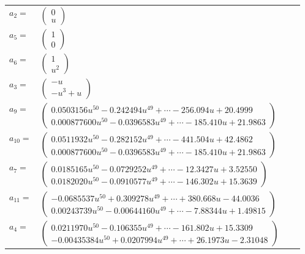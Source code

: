 \documentclass[1p]{elsarticle_modified}
\theoremstyle{definition}
\begin{document}
\begin{tabular}{m{7pt} m{180pt} m{7pt} m{180pt} }
\flushright $a_{2}=$&$\begin{pmatrix}0\\u\end{pmatrix}$ \\
\flushright $a_{5}=$&$\begin{pmatrix}1\\0\end{pmatrix}$ \\
\flushright $a_{6}=$&$\begin{pmatrix}1\\u^2\end{pmatrix}$ \\
\flushright $a_{3}=$&$\begin{pmatrix}- u\\- u^3+u\end{pmatrix}$ \\
\flushright $a_{9}=$&$\begin{pmatrix}0.0503156 u^{50}-0.242494 u^{49}+\cdots-256.094 u+20.4999\\0.000877600 u^{50}-0.0396583 u^{49}+\cdots-185.410 u+21.9863\end{pmatrix}$ \\
\flushright $a_{10}=$&$\begin{pmatrix}0.0511932 u^{50}-0.282152 u^{49}+\cdots-441.504 u+42.4862\\0.000877600 u^{50}-0.0396583 u^{49}+\cdots-185.410 u+21.9863\end{pmatrix}$ \\
\flushright $a_{7}=$&$\begin{pmatrix}0.0185165 u^{50}-0.0729252 u^{49}+\cdots-12.3427 u+3.52550\\0.0182020 u^{50}-0.0910577 u^{49}+\cdots-146.302 u+15.3639\end{pmatrix}$ \\
\flushright $a_{11}=$&$\begin{pmatrix}-0.0685537 u^{50}+0.309278 u^{49}+\cdots+380.668 u-44.0036\\0.00243739 u^{50}-0.00644160 u^{49}+\cdots-7.88344 u+1.49815\end{pmatrix}$ \\
\flushright $a_{4}=$&$\begin{pmatrix}0.0211970 u^{50}-0.106355 u^{49}+\cdots-161.802 u+15.3309\\-0.00435384 u^{50}+0.0207994 u^{49}+\cdots+26.1973 u-2.31048\end{pmatrix}$ \\

\end{tabular}
\end{document}
